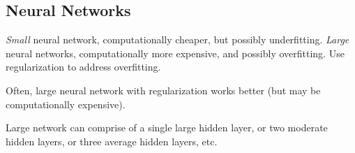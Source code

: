 \subsection{Neural Networks}
\emph{Small} neural network, computationally cheaper, but possibly underfitting.
\emph{Large} neural networks, computationally more expensive, and possibly overfitting.
Use regularization to address overfitting.

Often, large neural network with regularization works better (but may be computationally
expensive).

Large network can comprise of a single large hidden layer, or two moderate hidden layers, or
three average hidden layers, etc.


